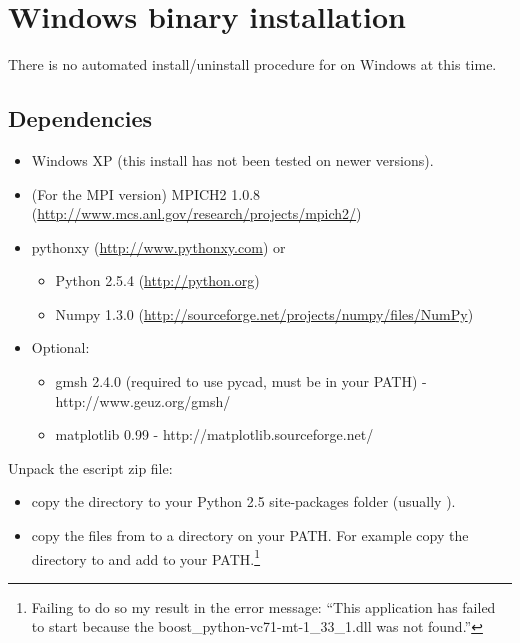 %
%
%

\section{Windows binary installation}
\label{sec:binwin}

There is no automated install/uninstall procedure for \esfinley on Windows at this time.

\subsection{Dependencies}
\begin{itemize}
 \item Windows XP (this install has not been tested on newer versions).
 \item (For the MPI version) MPICH2 1.0.8 \\
(\url{http://www.mcs.anl.gov/research/projects/mpich2/})
 \item pythonxy (\url{http://www.pythonxy.com}) or 
  \begin{itemize}
	\item Python 2.5.4 (\url{http://python.org})
	\item Numpy 1.3.0 (\url{http://sourceforge.net/projects/numpy/files/NumPy})
  \end{itemize}
  \item Optional:
  \begin{itemize}
 \item gmsh 2.4.0 (required to use pycad, must be in your PATH) - http://www.geuz.org/gmsh/
\item matplotlib 0.99 - http://matplotlib.sourceforge.net/
\end{itemize}

\end{itemize}


Unpack the escript zip file:
\begin{itemize}
\item 
 copy the  directory to your Python 2.5 site-packages folder (usually ).
\item 
 copy the  files from  to a directory on your PATH. For example copy the directory to  and add   to your PATH.\footnote{Failing to do so my result in the error message:
``This application has failed to start because the boost_python-vc71-mt-1_33_1.dll was not found.''
}
\end{itemize}

